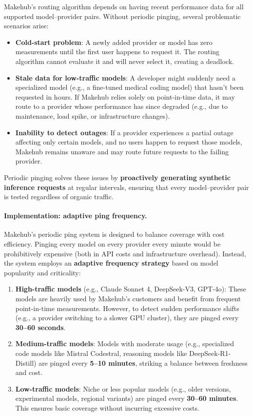 \documentclass[english]{article}
\begin{document}
Makehub's routing algorithm depends on having recent performance data for all supported model–provider pairs. Without periodic pinging, several problematic scenarios arise:
\begin{itemize}
    \item \textbf{Cold-start problem}: A newly added provider or model has zero measurements until the first user happens to request it. The routing algorithm cannot evaluate it and will never select it, creating a deadlock.
    \item \textbf{Stale data for low-traffic models}: A developer might suddenly need a specialized model (e.g., a fine-tuned medical coding model) that hasn't been requested in hours. If Makehub relies solely on point-in-time data, it may route to a provider whose performance has since degraded (e.g., due to maintenance, load spike, or infrastructure changes).
    \item \textbf{Inability to detect outages}: If a provider experiences a partial outage affecting only certain models, and no users happen to request those models, Makehub remains unaware and may route future requests to the failing provider.
\end{itemize}

Periodic pinging solves these issues by \textbf{proactively generating synthetic inference requests} at regular intervals, ensuring that every model–provider pair is tested regardless of organic traffic.

\paragraph{Implementation: adaptive ping frequency.}

Makehub's periodic ping system is designed to balance coverage with cost efficiency. Pinging every model on every provider every minute would be prohibitively expensive (both in API costs and infrastructure overhead). Instead, the system employs an \textbf{adaptive frequency strategy} based on model popularity and criticality:

\begin{enumerate}
    \item \textbf{High-traffic models} (e.g., Claude Sonnet 4, DeepSeek-V3, GPT-4o): These models are heavily used by Makehub's customers and benefit from frequent point-in-time measurements. However, to detect sudden performance shifts (e.g., a provider switching to a slower GPU cluster), they are pinged every \textbf{30--60 seconds}.

    \item \textbf{Medium-traffic models}: Models with moderate usage (e.g., specialized code models like Mistral Codestral, reasoning models like DeepSeek-R1-Distill) are pinged every \textbf{5--10 minutes}, striking a balance between freshness and cost.

    \item \textbf{Low-traffic models}: Niche or less popular models (e.g., older versions, experimental models, regional variants) are pinged every \textbf{30--60 minutes}. This ensures basic coverage without incurring excessive costs.
\end{enumerate}
\end{document}
